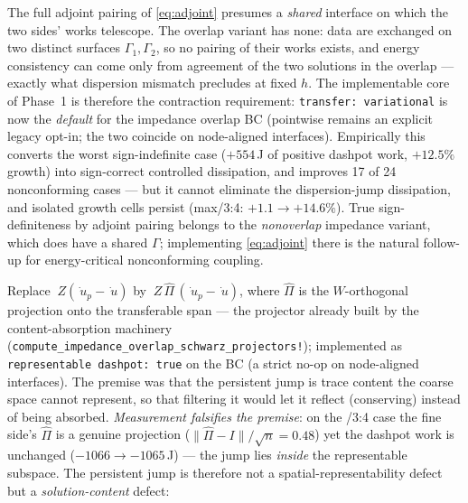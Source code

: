\documentclass[11pt]{article}
\newcommand{\norm}[1]{\lVert #1 \rVert}
\newcommand{\code}[1]{\texttt{#1}}
\begin{document}
\begin{description}[style=unboxed,leftmargin=0pt,itemsep=2pt]
  \item[Phase 1 --- variational transfer by default
  \emph{(implemented, reframed)}.] The full adjoint pairing of
  \eqref{eq:adjoint} presumes a \emph{shared} interface on which the two
  sides' works telescope. The overlap variant has none: data are exchanged on
  two distinct surfaces $\Gamma_1, \Gamma_2$, so no pairing of their works
  exists, and energy consistency can come only from agreement of the two
  solutions in the overlap --- exactly what dispersion mismatch precludes at
  fixed $h$. The implementable core of Phase~1 is therefore the contraction
  requirement: \code{transfer: variational} is now the \emph{default} for the
  impedance overlap BC (pointwise remains an explicit legacy opt-in; the two
  coincide on node-aligned interfaces). Empirically this converts the worst
  sign-indefinite case ($+554$\,J of positive dashpot work, $+12.5\%$ growth)
  into sign-correct controlled dissipation, and improves 17 of 24
  nonconforming cases --- but it cannot eliminate the dispersion-jump
  dissipation, and isolated growth cells persist (max/3:4:
  $+1.1 \to +14.6\%$). True sign-definiteness by adjoint pairing belongs to
  the \emph{nonoverlap} impedance variant, which does have a shared
  $\Gamma$; implementing \eqref{eq:adjoint} there is the natural follow-up
  for energy-critical nonconforming coupling.
  \item[Phase 2 --- dashpot on the representable jump
  \emph{(implemented; falsified)}.] Replace $~Z(\dot{~u}_p - \dot{~u})$ by
  $~Z\,\widehat\Pi\,(\dot{~u}_p - \dot{~u})$, where $\widehat\Pi$ is the
  $W$-orthogonal projection onto the transferable span --- the projector
  already built by the content-absorption machinery
  (\code{compute\_impedance\_overlap\_schwarz\_projectors!}); implemented as
  \code{representable dashpot: true} on the BC (a strict no-op on node-aligned
  interfaces). The premise was that the persistent jump is trace content the
  coarse space cannot represent, so that filtering it would let it reflect
  (conserving) instead of being absorbed. \emph{Measurement falsifies the
  premise}: on the \textonequarter/3:4 case the fine side's $\widehat\Pi$ is a
  genuine projection ($\norm{\widehat\Pi - I}/\sqrt{n} = 0.48$) yet the
  dashpot work is unchanged ($-1066 \to -1065$\,J) --- the jump lies
  \emph{inside} the representable subspace. The persistent jump is therefore
  not a spatial-representability defect but a \emph{solution-content} defect:

\end{description}
\end{document}
